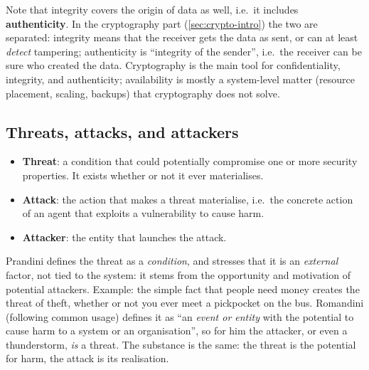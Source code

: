 Note that integrity covers the origin of data as well, i.e.\ it includes \textbf{authenticity}. In the cryptography part (\cref{sec:crypto-intro}) the two are separated: integrity means that the receiver gets the data as sent, or can at least \emph{detect} tampering; authenticity is \enquote{integrity of the sender}, i.e.\ the receiver can be sure who created the data. Cryptography is the main tool for confidentiality, integrity, and authenticity; availability is mostly a system-level matter (resource placement, scaling, backups) that cryptography does not solve.

\subsection{Threats, attacks, and attackers}

\begin{definition}
\leavevmode
\begin{itemize}
    \item \textbf{Threat}: a condition that could potentially compromise one or more security properties. It exists whether or not it ever materialises.
    \item \textbf{Attack}: the action that makes a threat materialise, i.e.\ the concrete action of an agent that exploits a vulnerability to cause harm.
    \item \textbf{Attacker}: the entity that launches the attack.
\end{itemize}
\end{definition}

\begin{remark}
Prandini defines the threat as a \emph{condition}, and stresses that it is an \emph{external} factor, not tied to the system: it stems from the opportunity and motivation of potential attackers. Example: the simple fact that people need money creates the threat of theft, whether or not you ever meet a pickpocket on the bus. Romandini (following common usage) defines it as \enquote{an \emph{event or entity} with the potential to cause harm to a system or an organisation}, so for him the attacker, or even a thunderstorm, \emph{is} a threat. The substance is the same: the threat is the potential for harm, the attack is its realisation.
\end{remark}

